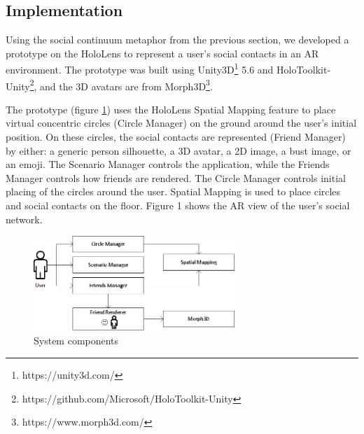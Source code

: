 \subsection{Implementation}

Using the social continuum metaphor from the previous section, we developed a prototype on the HoloLens to represent a user's social contacts in an AR environment. 
The prototype was built using Unity3D\footnote{https://unity3d.com/} 5.6 and HoloToolkit-Unity\footnote{https://github.com/Microsoft/HoloToolkit-Unity}, and the 3D avatars are from Morph3D\footnote{https://www.morph3d.com/}. 


The prototype (figure \ref{fig:contacts:system-diagram}) uses the HoloLens Spatial Mapping feature to place virtual concentric circles (Circle Manager) on the ground around the user's initial position. On these circles, the social contacts are represented (Friend Manager) by either: a generic person silhouette, a 3D avatar, a 2D image, a bust image, or an emoji. The Scenario Manager controls the application, while the Friends Manager controls how friends are rendered. The Circle Manager controls initial placing of the circles around the user. Spatial Mapping is used to place circles and social contacts on the floor. Figure 1 shows the AR view of the user's social network.


\begin{figure}[ht]
  \centering
  \includegraphics[width=3in]{images/system-diagram.eps}
  \caption{System components}
	\label{fig:contacts:system-diagram}
\end{figure}




